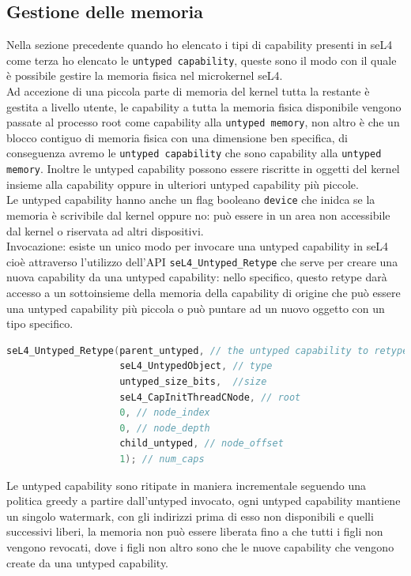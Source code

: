 \subsection{Gestione delle memoria}
Nella sezione precedente quando ho elencato i tipi di capability presenti in seL4 come terza ho elencato le \texttt{untyped capability}, queste sono il modo con il quale è possibile gestire la memoria fisica nel microkernel seL4.\\
Ad accezione di una piccola parte di memoria del kernel tutta la restante è gestita a livello utente, le capability a tutta la memoria fisica disponibile vengono passate al processo root come capability alla \texttt{untyped memory}, non altro è che un blocco contiguo di memoria fisica con una dimensione ben specifica, di conseguenza avremo le \texttt{untyped capability} che sono capability alla \texttt{untyped memory}. Inoltre le untyped capability possono essere riscritte in oggetti del kernel insieme alla capability oppure in ulteriori untyped capability più piccole.\\
Le untyped capability hanno anche un flag booleano \texttt{device} che inidca se la memoria è scrivibile dal kernel oppure no: può essere in un area non accessibile dal kernel o riservata ad altri dispositivi.\\
Invocazione: esiste un unico modo per invocare una untyped capability in seL4 cioè attraverso l'utilizzo dell'API \texttt{seL4\_Untyped\_Retype} che serve per creare una nuova capability da una untyped capability: nello specifico, questo retype darà accesso a un sottoinsieme della memoria della capability di origine che può essere una untyped capability più piccola o può puntare ad un nuovo oggetto con un tipo specifico.
\begin{lstlisting}[language=C++]
seL4_Untyped_Retype(parent_untyped, // the untyped capability to retype
                    seL4_UntypedObject, // type
                    untyped_size_bits,  //size
                    seL4_CapInitThreadCNode, // root
                    0, // node_index
                    0, // node_depth
                    child_untyped, // node_offset
                    1); // num_caps
\end{lstlisting}
Le untyped capability sono ritipate in maniera incrementale seguendo una politica greedy a partire dall'untyped invocato, ogni untyped capability mantiene un singolo watermark, con gli indirizzi prima di esso non disponibili e quelli successivi liberi, la memoria non può essere liberata fino a che tutti i figli non vengono revocati, dove i figli non altro sono che le nuove capability che vengono create da una untyped capability.\\
